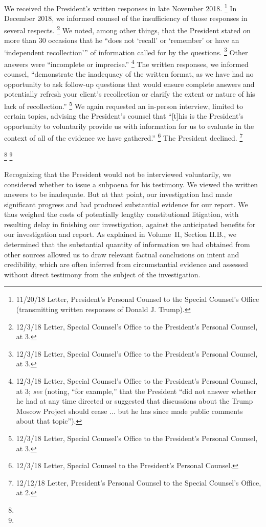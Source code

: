 We received the President’s written responses in late November 2018.%
\footnote{11/20/18 Letter, President’s Personal Counsel to the Special Counsel’s Office (transmitting written responses of Donald J. Trump).}
In December 2018, we informed counsel of the insufficiency of those responses in several respects.%
\footnote{12/3/18 Letter, Special Counsel’s Office to the President’s Personal Counsel, at 3.}
We noted, among other things, that the President stated on more than 30 occasions that he “does not ‘recall’ or ‘remember’ or have an ‘independent recollection’” of information called for by the questions.%
\footnote{12/3/18 Letter, Special Counsel’s Office to the President’s Personal Counsel, at 3.}
Other answers were “incomplete or imprecise.”%
\footnote{12/3/18 Letter, Special Counsel’s Office to the President’s Personal Counsel, at 3;
\textit{see} (noting, “for example,” that the President “did not answer whether he had at any time directed or suggested that discussions about the Trump Moscow Project should cease ... but he has since made public comments about that topic”).}
The written responses, we informed counsel, “demonstrate the inadequacy of the written format, as we have had no opportunity to ask follow-up questions that would ensure complete answers and potentially refresh your client’s recollection or clarify the extent or nature of his lack of recollection.”%
\footnote{12/3/18 Letter, Special Counsel’s Office to the President’s Personal Counsel, at 3.}
We again requested an in-person interview, limited to certain topics, advising the President’s counsel that “[t]his is the President’s opportunity to voluntarily provide us with information for us to evaluate in the context of all of the evidence we have gathered.”%
\footnote{12/3/18 Letter, Special Counsel to the President’s Personal Counsel.}
The President declined.%
\footnote{12/12/18 Letter, President’s Personal Counsel to the Special Counsel’s Office, at 2.}

\footnote{}
\footnote{}

Recognizing that the President would not be interviewed voluntarily, we considered whether to issue a subpoena for his testimony.
We viewed the written answers to be inadequate.
But at that point, our investigation had made significant progress and had produced substantial evidence for our report.
We thus weighed the costs of potentially lengthy constitutional litigation, with resulting delay in finishing our investigation, against the anticipated benefits for our investigation and report.
As explained in Volume~II, Section II.B., we determined that the substantial quantity of information we had obtained from other sources allowed us to draw relevant factual conclusions on intent and credibility, which are often inferred from circumstantial evidence and assessed without direct testimony from the subject of the investigation.

